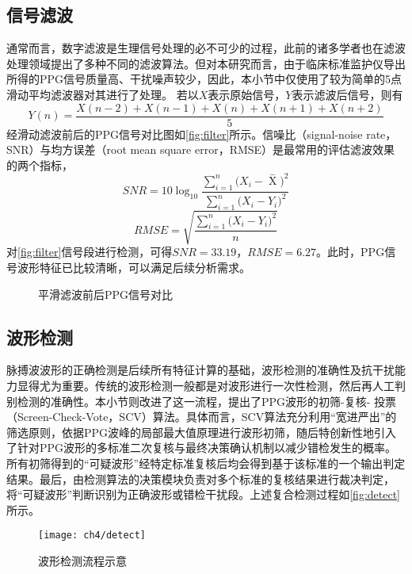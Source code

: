 \subsection{信号滤波}
通常而言，数字滤波是生理信号处理的必不可少的过程，此前的诸多学者也在滤波处理领域提出了多种不同的滤波算法。但对本研究而言，由于临床标准监护仪导出所得的PPG信号质量高、干扰噪声较少，因此，本小节中仅使用了较为简单的5点滑动平均滤波器对其进行了处理。
若以$X$表示原始信号，$Y$表示滤波后信号，则有
\begin{equation}
    \label{equ:filter}
    Y(n)=\frac{X(n-2)+X(n-1)+X(n)+X(n+1)+X(n+2)}{5}
\end{equation}
经滑动滤波前后的PPG信号对比图如\autoref{fig:filter}所示。信噪比（signal-noise rate，SNR）与均方误差（root mean square error，RMSE）是最常用的评估滤波效果的两个指标，
\begin{equation}
    \label{equ:snr}
    SNR=10\log_{10}\frac{\sum_{i=1}^{n}{(X_i-\mathop{X} \limits^-})^2}{\sum_{i=1}^{n}{(X_i-Y_i})^2}
\end{equation}
\begin{equation}
    \label{equ:rmse}
    RMSE=\sqrt{\frac{\sum_{i=1}^{n}{(X_i-Y_i})^2}{n}}
\end{equation}
对\autoref{fig:filter}信号段进行检测，可得$SNR=33.19$，$RMSE=6.27$。此时，PPG信号波形特征已比较清晰，可以满足后续分析需求。
\begin{figure}[htbp]
    \centering
    \quad
    \caption{\label{fig:filter}平滑滤波前后PPG信号对比}
\end{figure}

\subsection{波形检测}
脉搏波波形的正确检测是后续所有特征计算的基础，波形检测的准确性及抗干扰能力显得尤为重要。传统的波形检测一般都是对波形进行一次性检测，然后再人工判别检测的准确性。本小节则改进了这一流程，提出了PPG波形的初筛-复核-
投票（Screen-Check-Vote，SCV）算法。具体而言，SCV算法充分利用“宽进严出”的筛选原则，依据PPG波峰的局部最大值原理进行波形初筛，随后特创新性地引入了针对PPG波形的多标准二次复核与最终决策确认机制以减少错检发生的概率。
所有初筛得到的“可疑波形”经特定标准复核后均会得到基于该标准的一个输出判定结果。最后，由检测算法的决策模块负责对多个标准的复核结果进行裁决判定，将“可疑波形”判断识别为正确波形或错检干扰段。上述复合检测过程如\autoref{fig:detect}所示。
\begin{figure}[htbp]
    \centering
    \texttt{[image: ch4/detect]}
    \caption{\label{fig:detect}波形检测流程示意}
\end{figure}

